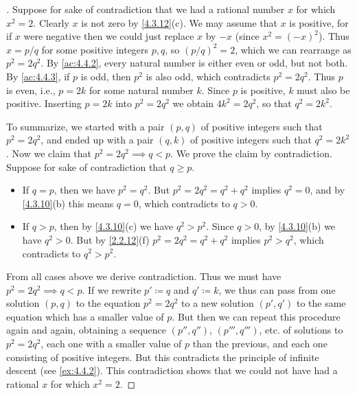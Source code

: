 \begin{proof}[]
  Suppose for sake of contradiction that we had a rational number \(x\) for which \(x^2 = 2\).
  Clearly \(x\) is not zero by \cref{4.3.12}(c).
  We may assume that \(x\) is positive, for if \(x\) were negative then we could just replace \(x\) by \(-x\)
  (since \(x^2 = (-x)^2\)).
  Thus \(x = p / q\) for some positive integers \(p, q\), so \((p / q)^2 = 2\), which we can rearrange as \(p^2 = 2q^2\).
  By \cref{ac:4.4.2}, every natural number is either even or odd, but not both.
  By \cref{ac:4.4.3}, if \(p\) is odd, then \(p^2\) is also odd, which contradicts \(p^2 = 2q^2\).
  Thus \(p\) is even, i.e., \(p = 2k\) for some natural number \(k\).
  Since \(p\) is positive, \(k\) must also be positive.
  Inserting \(p = 2k\) into \(p^2 = 2q^2\) we obtain \(4k^2 = 2q^2\), so that \(q^2 = 2k^2\).

  To summarize, we started with a pair \((p, q)\) of positive integers such that \(p^2 = 2q^2\), and ended up with a pair \((q, k)\) of positive integers such that \(q^2 = 2k^2\).
  Now we claim that \(p^2 = 2q^2 \implies q < p\).
  We prove the claim by contradiction.
  Suppose for sake of contradiction that \(q \geq p\).
  \begin{itemize}
    \item If \(q = p\), then we have \(p^2 = q^2\).
          But \(p^2 = 2q^2 = q^2 + q^2\) implies \(q^2 = 0\), and by \cref{4.3.10}(b) this means \(q = 0\), which contradicts to \(q > 0\).
    \item If \(q > p\), then by \cref{4.3.10}(c) we have \(q^2 > p^2\).
          Since \(q > 0\), by \cref{4.3.10}(b) we have \(q^2 > 0\).
          But by \cref{2.2.12}(f) \(p^2 = 2q^2 = q^2 + q^2\) implies \(p^2 > q^2\), which contradicts to \(q^2 > p^2\).
  \end{itemize}
  From all cases above we derive contradiction.
  Thus we must have \(p^2 = 2q^2 \implies q < p\).
  If we rewrite \(p' \coloneqq q\) and \(q' \coloneqq k\), we thus can pass from one solution \((p, q)\) to the equation \(p^2 = 2q^2\) to a new solution \((p', q')\) to the same equation which has a smaller value of \(p\).
  But then we can repeat this procedure again and again, obtaining a sequence \((p'', q'')\), \((p''', q''')\), etc. of solutions to \(p^2 = 2q^2\), each one with a smaller value of \(p\) than the previous, and each one consisting of positive integers.
  But this contradicts the principle of infinite descent (see \cref{ex:4.4.2}).
  This contradiction shows that we could not have had a rational \(x\) for which \(x^2 = 2\).
\end{proof}

